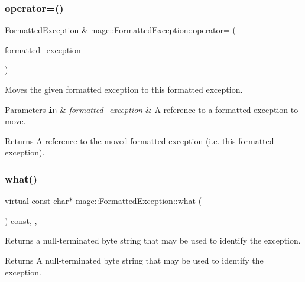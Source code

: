 \subsubsection{\texorpdfstring{operator=()}{operator=()}\hspace{0.1cm}{\footnotesize\ttfamily [2/2]}}
{\footnotesize\ttfamily \hyperlink{structmage_1_1_formatted_exception}{Formatted\+Exception} \& mage\+::\+Formatted\+Exception\+::operator= (\begin{DoxyParamCaption}\item[{\hyperlink{structmage_1_1_formatted_exception}{Formatted\+Exception} \&\&}]{formatted\+\_\+exception }\end{DoxyParamCaption})\hspace{0.3cm}{\ttfamily [default]}}

Moves the given formatted exception to this formatted exception.


\begin{DoxyParams}[1]{Parameters}
\mbox{\tt in}  & {\em formatted\+\_\+exception} & A reference to a formatted exception to move. \\
\hline
\end{DoxyParams}
\begin{DoxyReturn}{Returns}
A reference to the moved formatted exception (i.\+e. this formatted exception). 
\end{DoxyReturn}
\hypertarget{structmage_1_1_formatted_exception_af24583c71b3cb760039f35d534b95ead}{}\label{structmage_1_1_formatted_exception_af24583c71b3cb760039f35d534b95ead} 
\subsubsection{\texorpdfstring{what()}{what()}}
{\footnotesize\ttfamily virtual const char$\ast$ mage\+::\+Formatted\+Exception\+::what (\begin{DoxyParamCaption}{ }\end{DoxyParamCaption}) const\hspace{0.3cm}{\ttfamily [override]}, {\ttfamily [virtual]}, {\ttfamily [noexcept]}}

Returns a null-\/terminated byte string that may be used to identify the exception.

\begin{DoxyReturn}{Returns}
A null-\/terminated byte string that may be used to identify the exception. 
\end{DoxyReturn}


